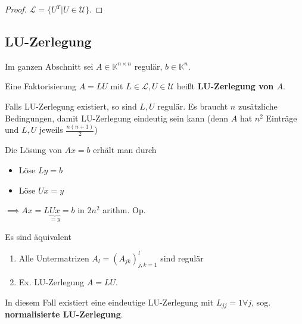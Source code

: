 \begin{proof}
	$\mathcal{L} = \{U^T | U \in \mathcal{U}\}$.
\end{proof}

\subsection{LU-Zerlegung}

Im ganzen Abschnitt sei $A \in \mathbb{K}^{n \times n}$ regulär, $b \in \mathbb{K}^n$.

\begin{definition}
	Eine Faktorisierung $A=LU$ mit $L \in \mathcal{L}, U \in \mathcal{U}$ heißt \textbf{LU-Zerlegung von $A$}.
\end{definition}

\begin{remark}
	Falls LU-Zerlegung existiert, so sind $L,U$ regulär. Es braucht $n$ zusätzliche Bedingungen, damit LU-Zerlegung eindeutig sein kann (denn $A$ hat $n^2$ Einträge und $L,U$ jeweils $\frac{n(n+1)}{2}$)
	
	Die Lösung von $Ax=b$ erhält man durch 
	\begin{itemize}
		\item Löse $Ly=b$
		\item Löse $Ux=y$
	\end{itemize}
	$\implies Ax = L\underbrace{Ux}_{=y} = b$ in $2n^2$ arithm. Op.
\end{remark}

\begin{theorem}
	Es sind äquivalent
	\begin{enumerate}
		\item Alle Untermatrizen $A_l = (A_{jk})_{j,k=1}^l$ sind regulär
		\item Ex. LU-Zerlegung $A=LU$.
	\end{enumerate}
	In diesem Fall existiert eine eindeutige LU-Zerlegung mit $L_{jj} = 1 \forall j$, sog. \textbf{normalisierte LU-Zerlegung}.
\end{theorem}

